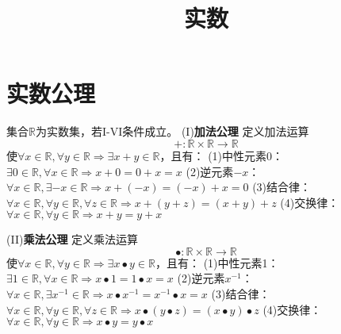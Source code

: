 \documentclass[11pt]{article}
\title{实数}
\date{}
\begin{document}
  \maketitle

  \linenumbers
\section{实数公理}
集合$\mathbb{R}$为实数集，若I-VI条件成立。\newline
(I)\textbf{加法公理} \newline
定义加法运算
\begin{equation}
    +:\mathbb{R} \times \mathbb{R} \rightarrow \mathbb{R}
\end{equation}
使$\forall x \in \mathbb{R}, \forall y \in \mathbb{R} \Rightarrow \exists x+y \in \mathbb{R}$，且有：\newline
(1)中性元素0：\newline
$\exists 0 \in \mathbb{R}, \forall x \in \mathbb{R} \Rightarrow x+0=0+x=x$ \newline
(2)逆元素$-x$： \newline
$\forall x \in \mathbb{R}, \exists -x \in \mathbb{R} \Rightarrow x+(-x)=(-x)+x=0$ \newline
(3)结合律：\newline
$\forall x \in \mathbb{R}, \forall y \in \mathbb{R}, \forall z \in \mathbb{R} \Rightarrow x+(y+z)=(x+y)+z$ \newline
(4)交换律：\newline
$\forall x \in \mathbb{R}, \forall y \in \mathbb{R} \Rightarrow x+y=y+x$ \newline

(II)\textbf{乘法公理} \newline
定义乘法运算
\begin{equation}
    \bullet:\mathbb{R} \times \mathbb{R} \rightarrow \mathbb{R}
\end{equation}
使$\forall x \in \mathbb{R}, \forall y \in \mathbb{R} \Rightarrow \exists x \bullet y\in\mathbb{R}$，且有： \newline
(1)中性元素1：\newline
$\exists 1 \in \mathbb{R}, \forall x \in \mathbb{R} \Rightarrow x \bullet 1=1 \bullet x=x$ \newline
(2)逆元素$x^{-1}$：\newline
$\forall x \in \mathbb{R}, \exists x^{-1} \in \mathbb{R} \Rightarrow x \bullet x^{-1}=x^{-1} \bullet x=x$ \newline
(3)结合律：\newline
$\forall x \in \mathbb{R}, \forall y \in \mathbb{R}, \forall z \in \mathbb{R} \Rightarrow x \bullet (y \bullet z)=(x \bullet y) \bullet z$ \newline
(4)交换律：\newline
$\forall x \in \mathbb{R}, \forall y \in \mathbb{R} \Rightarrow x\bullet y=y\bullet x$ \newline
\end{document}
